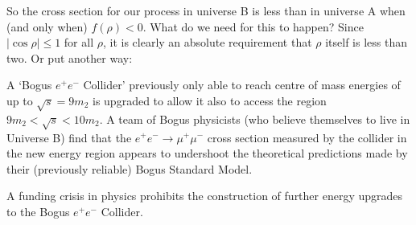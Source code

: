 \begin{allparts}
{So the cross section for our process in  universe B is less than in universe A when (and only when) $f(\rho)<0$.  What do we need for this to happen?   Since $|\cos\rho|\le 1$ for all $\rho$, it is clearly an absolute requirement that $\rho$ itself is less than two.  Or put another way:   
}
\endanswer
\end{allparts}
A `Bogus $e^+e^-$ Collider' previously only able to reach centre of mass energies of up to $\sqrt s=9m_2$ is upgraded to allow it also to access the region $9m_2<\sqrt s<10 m_2$.  A team of Bogus physicists (who believe themselves to live in Universe B) find that  the $e^+e^-\rightarrow \mu^+\mu^-$ cross section measured by the collider in the new energy region appears    to undershoot the theoretical predictions made by their (previously reliable) Bogus Standard Model.
A %
funding crisis in physics %
prohibits the construction of further energy upgrades to the Bogus $e^+e^-$ Collider. 

